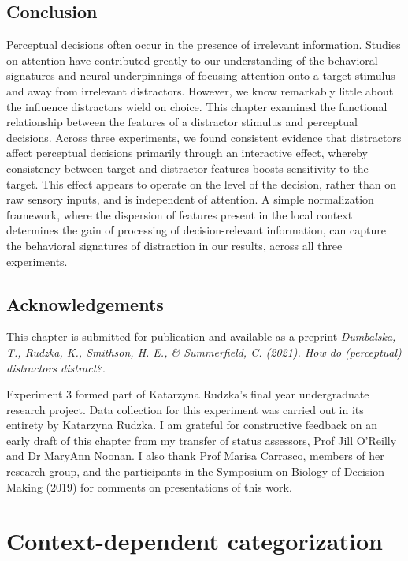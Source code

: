 \documentclass[a4paper, nobind]{templates/ociamthesis}
\begin{document}
\hypertarget{conclusion-1}{%
\section{Conclusion}\label{conclusion-1}}

Perceptual decisions often occur in the presence of irrelevant information. Studies on attention have contributed greatly to our understanding of the behavioral signatures and neural underpinnings of focusing attention onto a target stimulus and away from irrelevant distractors. However, we know remarkably little about the influence distractors wield on choice. This chapter examined the functional relationship between the features of a distractor stimulus and perceptual decisions. Across three experiments, we found consistent evidence that distractors affect perceptual decisions primarily through an interactive effect, whereby consistency between target and distractor features boosts sensitivity to the target. This effect appears to operate on the level of the decision, rather than on raw sensory inputs, and is independent of attention. A simple normalization framework, where the dispersion of features present in the local context determines the gain of processing of decision-relevant information, can capture the behavioral signatures of distraction in our results, across all three experiments.

\hypertarget{acknowledgements-1}{%
\section{Acknowledgements}\label{acknowledgements-1}}

This chapter is submitted for publication and available as a preprint \emph{Dumbalska, T., Rudzka, K., Smithson, H. E., \& Summerfield, C. (2021). How do (perceptual) distractors distract?.}

Experiment 3 formed part of Katarzyna Rudzka's final year undergraduate research project. Data collection for this experiment was carried out in its entirety by Katarzyna Rudzka. I am grateful for constructive feedback on an early draft of this chapter from my transfer of status assessors, Prof Jill O'Reilly and Dr MaryAnn Noonan. I also thank Prof Marisa Carrasco, members of her research group, and the participants in the Symposium on Biology of Decision Making (2019) for comments on presentations of this work.

\hypertarget{cat}{%
\chapter{Context-dependent categorization}\label{cat}}
\end{document}

